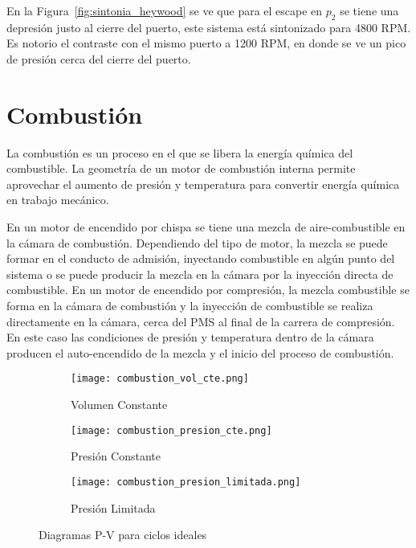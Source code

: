 En la Figura~\ref{fig:sintonia_heywood} se ve que para el escape en $p_2$ se
tiene una depresión justo al cierre del puerto, este sistema está sintonizado
para 4800 RPM.
%
Es notorio el contraste con el mismo puerto a 1200 RPM, en donde se ve un pico de
presión cerca del cierre del puerto.
%

\section{Combustión}
%
La combustión es un proceso en el que se libera la energía química del
combustible.
%
La geometría de un motor de combustión interna permite aprovechar
el aumento de presión y temperatura para convertir energía química en trabajo
mecánico.


En un motor de encendido por chispa se tiene una mezcla de aire-combustible en
la cámara de combustión.
%
Dependiendo del tipo de motor, la mezcla se puede formar en el conducto de
admisión, inyectando combustible en algún punto del sistema o se puede producir
la mezcla en la cámara por la inyección directa de combustible.
%
En un motor de encendido por compresión, la mezcla combustible se forma en la
cámara de combustión y la inyección de combustible se realiza directamente en la
cámara, cerca del PMS al final de la carrera de compresión.
%
En este caso las condiciones de presión y temperatura dentro de la cámara producen el
auto-encendido de la mezcla y el inicio del proceso de combustión.

\begin{figure}[h!]
  \centering
  \begin{subfigure}{0.3\textwidth}
    \centering
    \texttt{[image: combustion\_vol\_cte.png]}
    \caption{Volumen Constante}\label{fig:comb_vcte}
  \end{subfigure}%
  \begin{subfigure}{0.3\textwidth}
    \centering
    \texttt{[image: combustion\_presion\_cte.png]}
    \caption{Presión Constante}\label{fig:comb_pcte}
  \end{subfigure}%
  \begin{subfigure}{0.3\textwidth}
    \centering
    \texttt{[image: combustion\_presion\_limitada.png]}
    \caption{Presión Limitada}\label{fig:comb_plim}
  \end{subfigure}
  \caption{Diagramas P-V para ciclos ideales\parencite{heywood}}\label{fig:ciclos_ideales}
\end{figure}

